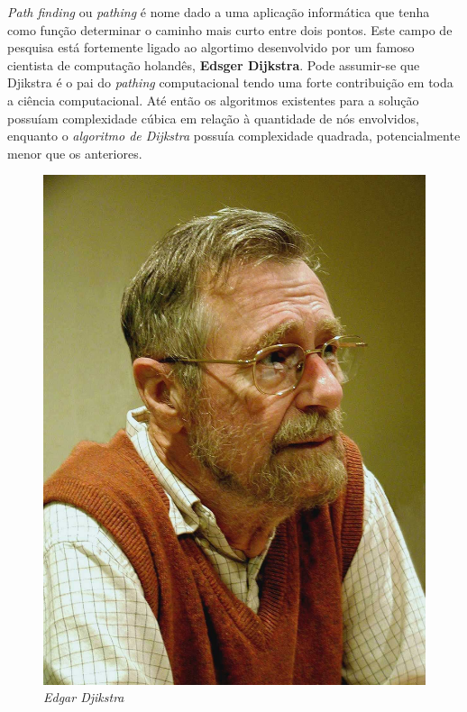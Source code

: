 \documentclass[a4paper]{article}
\begin{document}
\begin{small}

\textit{Path finding} ou \textit{pathing} é nome dado a uma aplicação informática que tenha como função determinar o caminho mais curto entre dois pontos. Este campo de pesquisa está fortemente ligado ao algortimo desenvolvido por um famoso cientista de computação holandês, \textbf{Edsger Dijkstra}. Pode assumir-se que Djikstra é o pai do \textit{pathing} computacional tendo uma forte contribuição em toda a ciência computacional. Até então os algoritmos existentes para a solução possuíam complexidade cúbica em relação à quantidade de nós envolvidos, enquanto o \textit{algoritmo de Dijkstra} possuía complexidade quadrada, potencialmente menor que os anteriores.

\end{small}


\begin{figure}[H]
\includegraphics[scale = 0.1]{Djikstra.jpg}
\centering
\caption{\textit{Edgar Djikstra}}
\end{figure}
\end{document}
